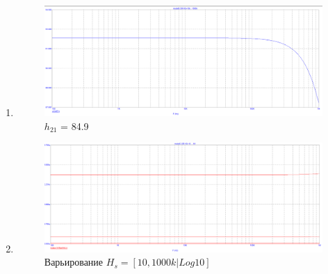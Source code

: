 \documentclass[a4paper, 12pt]{article}%
\begin{document}
\begin{enumerate}

\FloatBarrier
\item
\FloatBarrier
\begin{figure}
    \centering
    \includegraphics[scale=0.3]{images/mod5_1_1.png}
    \caption{$h_{21}$ = 84.9}
    \label{fig:m511}
\end{figure}
\FloatBarrier
\item
\FloatBarrier
\begin{figure}[h!]
    \centering
    \includegraphics[scale=0.3]{images/mod5_1_2_1.png}
    \caption{Варьирование $H_s = [10, 1000k|Log10]$}
    \label{fig:m5121}
\end{figure}


\end{enumerate}
\end{document}
